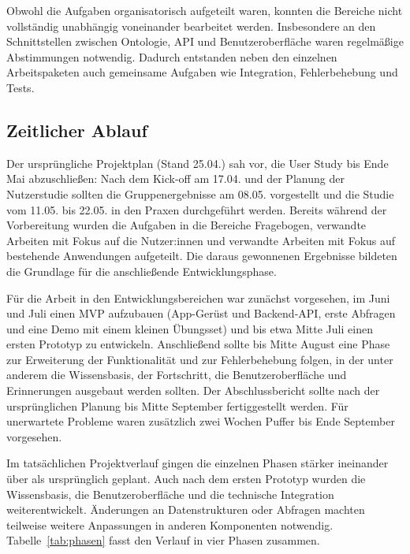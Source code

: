 Obwohl die Aufgaben organisatorisch aufgeteilt waren, konnten die Bereiche nicht vollständig unabhängig voneinander bearbeitet werden. Insbesondere an den Schnittstellen zwischen Ontologie, API und Benutzeroberfläche waren regelmäßige Abstimmungen notwendig. Dadurch entstanden neben den einzelnen Arbeitspaketen auch gemeinsame Aufgaben wie Integration, Fehlerbehebung und Tests.

\subsection{Zeitlicher Ablauf}
\label{sec:zeitablauf}

Der ursprüngliche Projektplan (Stand 25.04.) sah vor, die User Study bis Ende Mai abzuschließen: Nach dem Kick-off am 17.04. und der Planung der Nutzerstudie sollten die Gruppenergebnisse am 08.05. vorgestellt und die Studie vom 11.05. bis 22.05. in den Praxen durchgeführt werden. Bereits während der Vorbereitung wurden die Aufgaben in die Bereiche Fragebogen, verwandte Arbeiten mit Fokus auf die Nutzer:innen und verwandte Arbeiten mit Fokus auf bestehende Anwendungen aufgeteilt. Die daraus gewonnenen Ergebnisse bildeten die Grundlage für die anschließende Entwicklungsphase.

Für die Arbeit in den Entwicklungsbereichen war zunächst vorgesehen, im Juni und Juli einen MVP aufzubauen (App-Gerüst und Backend-API, erste Abfragen und eine Demo mit einem kleinen Übungsset) und bis etwa Mitte Juli einen ersten Prototyp zu entwickeln. Anschließend sollte bis Mitte August eine Phase zur Erweiterung der Funktionalität und zur Fehlerbehebung folgen, in der unter anderem die Wissensbasis, der Fortschritt, die Benutzeroberfläche und Erinnerungen ausgebaut werden sollten. Der Abschlussbericht sollte nach der ursprünglichen Planung bis Mitte September fertiggestellt werden. Für unerwartete Probleme waren zusätzlich zwei Wochen Puffer bis Ende September vorgesehen.

Im tatsächlichen Projektverlauf gingen die einzelnen Phasen stärker ineinander über als ursprünglich geplant. Auch nach dem ersten Prototyp wurden die Wissensbasis, die Benutzeroberfläche und die technische Integration weiterentwickelt. Änderungen an Datenstrukturen oder Abfragen machten teilweise weitere Anpassungen in anderen Komponenten notwendig. Tabelle~\ref{tab:phasen} fasst den Verlauf in vier Phasen zusammen.

